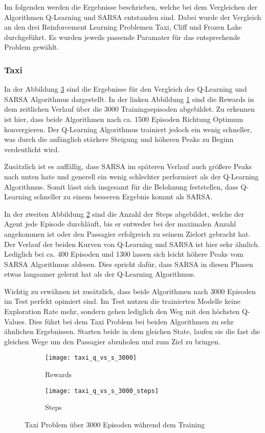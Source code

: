 Im folgenden werden die Ergebnisse beschrieben, welche bei dem Vergleichen der Algorithmen Q-Learning und SARSA entstanden sind.
Dabei wurde der Vergleich an den drei Reinforcement Learning Problemen Taxi, Cliff und Frozen Lake durchgeführt. Es wurden jeweils passende Paramater für das entsprechende Problem gewählt.
\subsubsection{Taxi}

In der Abbildung \ref{fig:taxi_train} sind die Ergebnisse für den Vergleich des Q-Learning und SARSA Algorithmus dargestellt. In der linken Abbildung \ref{fig:taxi_rew} sind die Rewards in dem zeitlichen Verlauf über die 3000 Trainingsepisoden abgebildet. Zu erkennen ist hier, dass beide Algorithmen nach ca. 1500 Episoden Richtung Optimum konvergieren. Der Q-Learning Algorithmus trainiert jedoch ein wenig schneller, was durch die anfänglich stärkere Steigung und höheren Peaks zu Beginn verdeutlicht wird.

Zusätzlich ist es auffällig, dass SARSA im späteren Verlauf auch größere Peaks nach unten hate und generell ein wenig schlechter performiert als der Q-Learning Algorithmus. Somit lässt sich insgesamt für die Belohnung feststellen, dass Q-Learning schneller zu einem besseren Ergebnis kommt als SARSA. 

In der zweiten Abbildung \ref{fig:taxi_step} sind die Anzahl der Steps abgebildet, welche der Agent jede Episode durchläuft, bis er entweder bei der maximalen Anzahl angekommen ist oder den Passagier erfolgreich zu seinem Zielort gebracht hat. Der Verlauf der beiden Kurven von Q-Learning und SARSA ist hier sehr ähnlich. Lediglich bei ca. 400 Episoden und 1300 lassen sich leicht höhere Peaks vom SARSA Algorithmus ablesen.
Dies spricht dafür, dass SARSA in diesen Phasen etwas langsamer gelernt hat als der Q-Learning Algorithmus.

Wichtig zu erwähnen ist zusätzlich, dass beide Algorithmen nach 3000 Episoden im Test perfekt opimiert sind. Im Test nutzen die trainierten Modelle keine Exploration Rate mehr, sondern gehen lediglich den Weg mit den höchsten Q-Values. Dies führt bei dem Taxi Problem bei beiden Algorithmen zu sehr ähnlichen Ergebnissen. Starten beide in dem gleichen State, laufen sie die fast die gleichen Wege um den Passagier abzuholen und zum Ziel zu bringen.

\begin{figure}[H]
    \centering
    \begin{subfigure}{.5\textwidth}
      \centering
      \texttt{[image: taxi\_q\_vs\_s\_3000]}
      \caption{Rewards}
      \label{fig:taxi_rew}
    \end{subfigure}%
    \begin{subfigure}{.5\textwidth}
      \centering
      \texttt{[image: taxi\_q\_vs\_s\_3000\_steps]}
      \caption{Steps}
      \label{fig:taxi_step}
    \end{subfigure}
    \caption{Taxi Problem über 3000 Episoden während dem Training}
    \label{fig:taxi_train}
\end{figure}

